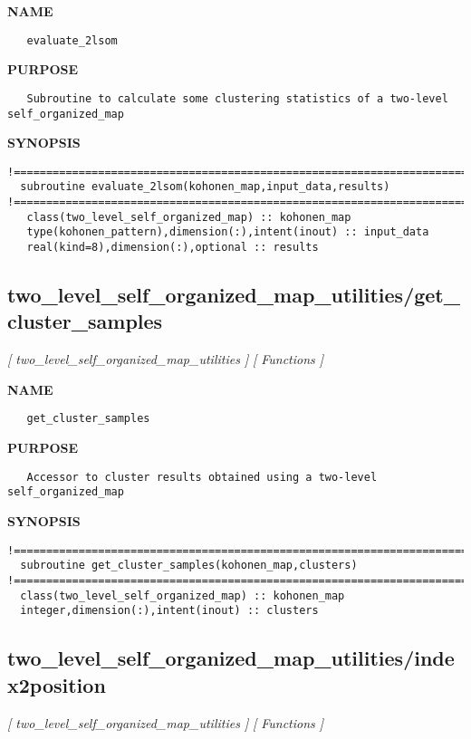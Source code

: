 \documentclass{article}
\begin{document}
\label{ch:robo68}
\label{ch:two_level_self_organized_map_utilities_evaluate_2lsom}
\textbf{NAME}
\begin{verbatim}
   evaluate_2lsom
\end{verbatim}
\textbf{PURPOSE}
\begin{verbatim}
   Subroutine to calculate some clustering statistics of a two-level self_organized_map 
\end{verbatim}
\textbf{SYNOPSIS}
\begin{verbatim}
!========================================================================================  
  subroutine evaluate_2lsom(kohonen_map,input_data,results)
!========================================================================================
   class(two_level_self_organized_map) :: kohonen_map
   type(kohonen_pattern),dimension(:),intent(inout) :: input_data
   real(kind=8),dimension(:),optional :: results
\end{verbatim}
\newpage
\subsection{two\_level\_self\_organized\_map\_utilities/get\_cluster\_samples}
\textsl{[ two\_level\_self\_organized\_map\_utilities ]}
\textsl{[ Functions ]}

\label{ch:robo69}
\label{ch:two_level_self_organized_map_utilities_get_cluster_samples}
\textbf{NAME}
\begin{verbatim}
   get_cluster_samples
\end{verbatim}
\textbf{PURPOSE}
\begin{verbatim}
   Accessor to cluster results obtained using a two-level self_organized_map 
\end{verbatim}
\textbf{SYNOPSIS}
\begin{verbatim}
!======================================================================================== 
  subroutine get_cluster_samples(kohonen_map,clusters)
!========================================================================================
  class(two_level_self_organized_map) :: kohonen_map
  integer,dimension(:),intent(inout) :: clusters
\end{verbatim}
\newpage
\subsection{two\_level\_self\_organized\_map\_utilities/index2position}
\textsl{[ two\_level\_self\_organized\_map\_utilities ]}
\textsl{[ Functions ]}
\end{document}

